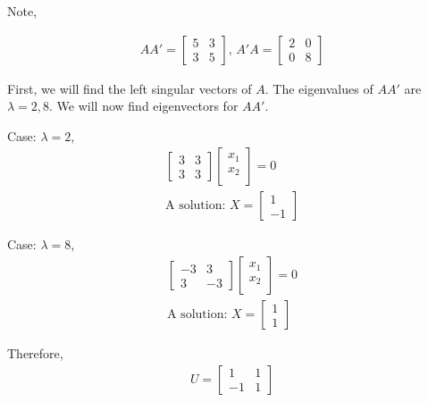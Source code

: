 Note,

\begin{eqnarray}
  AA' = 
  \begin{bmatrix}
    5 & 3 \\
    3 & 5
  \end{bmatrix}
  \text{,   }
  A'A = 
  \begin{bmatrix}
    2 & 0 \\
    0 & 8
  \end{bmatrix}
\end{eqnarray}

First, we will find the left singular vectors of \(A\).
The eigenvalues of \(AA'\) are \(\lambda = 2,8\).
We will now find eigenvectors for \(AA'\).

Case: \(\lambda = 2\),
\begin{eqnarray}
  \begin{bmatrix}
    3 & 3 \\
    3 & 3
  \end{bmatrix}
  \begin{bmatrix}
    x_1 \\
    x_2 \\
  \end{bmatrix}
  = 0 \\
  \text{A solution: }
  X = 
  \begin{bmatrix}
    1 \\
    -1
  \end{bmatrix}
\end{eqnarray}

Case: \(\lambda = 8 \),
\begin{eqnarray}
  \begin{bmatrix}
    -3 & 3 \\
    3 & -3
  \end{bmatrix}
  \begin{bmatrix}
    x_1 \\
    x_2 \\
  \end{bmatrix}
  = 0 \\
  \text{A solution: }
  X = 
  \begin{bmatrix}
    1 \\
    1
  \end{bmatrix}
\end{eqnarray}

Therefore,
\begin{eqnarray}
  U = 
  \begin{bmatrix}
    1 & 1 \\
    -1 & 1
  \end{bmatrix}
\end{eqnarray}


